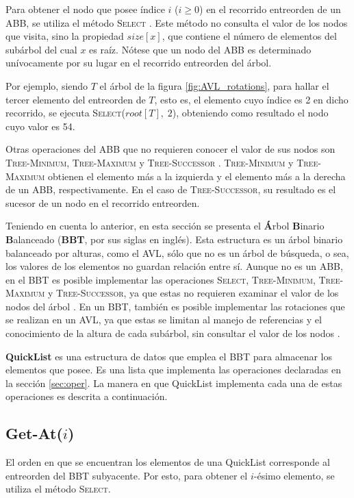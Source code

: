\documentclass[a4paper,10pt,twocolumn]{article}
\begin{document}
  Para obtener el nodo que posee índice $ i $ ($ i \geq 0 $) en el recorrido 
  entreorden de un ABB, se utiliza el método \textsc{Select} \cite[pág. 304]{MIT2}. 
  Este método no consulta el valor de los nodos que visita, sino la propiedad $ size[x] 
  $, que contiene el número de elementos del subárbol del cual $ x $ es raíz. Nótese que
  un nodo del ABB es determinado unívocamente por su lugar en el recorrido entreorden
  del árbol.
  
  Por ejemplo, siendo $ T $ el árbol de la figura \ref{fig:AVL_rotations}, para hallar el 
  tercer elemento del entreorden de $ T $, esto es, el elemento cuyo índice es 2 en dicho
  recorrido, se ejecuta \textsc{Select}($ root[T],\; 2 $), obteniendo como resultado el 
  nodo cuyo valor es 54.
  
  Otras operaciones del ABB que no requieren conocer el valor de sus nodos son
  \textsc{Tree-Minimum}, \textsc{Tree-Maximum} y \textsc{Tree-Successor} \cite[pág. 
  258-259]{MIT2}. \textsc{Tree-Minimum} y \textsc{Tree-Maximum} obtienen el elemento más a la 
  izquierda y el elemento más a la derecha de un ABB, respectivamente. En el caso de 
  \textsc{Tree-Successor}, su resultado es el sucesor de un nodo en el recorrido entreorden.
  
  Teniendo en cuenta lo anterior, en esta sección se presenta el \textbf{Á}rbol 
  \textbf{B}inario \textbf{B}alanceado (\textbf{BBT}, por sus siglas en inglés). Esta 
  estructura es un árbol binario balanceado por alturas, como el AVL, sólo que no es un 
  árbol de búsqueda, o sea, los valores de los elementos no guardan relación entre sí.
  Aunque no es un ABB, en el BBT es posible implementar las operaciones \textsc{Select},
  \textsc{Tree-Minimum}, \textsc{Tree-Maximum} y \textsc{Tree-Successor}, ya que estas no 
  requieren examinar el valor de los nodos del árbol \cite{MIT2}. En un BBT, también es 
  posible implementar las  rotaciones que se realizan en un AVL, ya que estas se limitan al 
  manejo de referencias y el conocimiento de la altura de cada subárbol, sin consultar el 
  valor de los nodos \cite{AVL}.
  
  \textbf{QuickList} es una estructura de datos que emplea el BBT para almacenar los
  elementos que posee. Es una lista que implementa las operaciones declaradas en la
  sección \ref{sec:oper}. La manera en que QuickList implementa cada una de estas 
  operaciones es descrita a continuación.
\subsection{Get-At($ i $)}\label{subsec:qlGet}
  El orden en que se encuentran los elementos de una QuickList corresponde al entreorden
  del BBT subyacente. Por esto, para obtener el $ i $-ésimo elemento, se utiliza el
  método \textsc{Select}.
  
\end{document}
